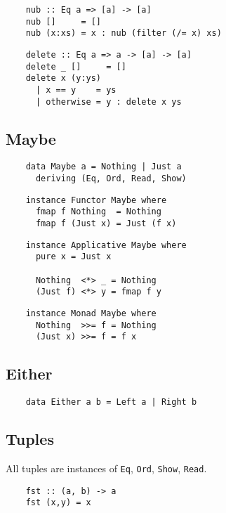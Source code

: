 \begin{multicols}{2}
	\begin{verbatim}
	nub :: Eq a => [a] -> [a]
	nub []     = []
	nub (x:xs) = x : nub (filter (/= x) xs)
	\end{verbatim}
	
	\begin{verbatim}
	delete :: Eq a => a -> [a] -> [a]
	delete _ []     = []
	delete x (y:ys) 
	  | x == y    = ys
	  | otherwise = y : delete x ys
	\end{verbatim}
	
	\subsection*{Maybe}
	
	\begin{verbatim}
	data Maybe a = Nothing | Just a
	  deriving (Eq, Ord, Read, Show)
	\end{verbatim}
	
	\begin{verbatim}
	instance Functor Maybe where
	  fmap f Nothing  = Nothing
	  fmap f (Just x) = Just (f x)
	\end{verbatim}
	
	\begin{verbatim}
	instance Applicative Maybe where
	  pure x = Just x
	  
	  Nothing  <*> _ = Nothing
	  (Just f) <*> y = fmap f y
	\end{verbatim}
	
	\begin{verbatim}
	instance Monad Maybe where
	  Nothing  >>= f = Nothing
	  (Just x) >>= f = f x
	\end{verbatim}
	
	\subsection*{Either}
	
	\begin{verbatim}
	data Either a b = Left a | Right b
	\end{verbatim}
	
	\subsection*{Tuples}
	
	All tuples are instances of \texttt{Eq}, \texttt{Ord}, \texttt{Show}, \texttt{Read}.
	
	\begin{verbatim}
	fst :: (a, b) -> a
	fst (x,y) = x
	\end{verbatim}
	

\end{multicols}
